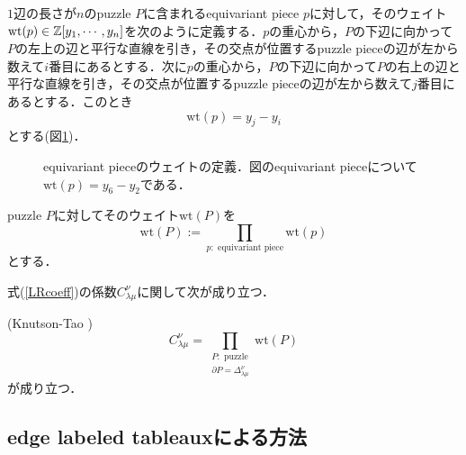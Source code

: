 \begin{defin}
  $1$辺の長さが$n$のpuzzle $P$に含まれるequivariant piece $p$に対して，そのウェイト$\text{wt}(p)\in\mathbb{Z}[y_1,\cdots,y_n]$を次のように定義する．$p$の重心から，$P$の下辺に向かって$P$の左上の辺と平行な直線を引き，その交点が位置するpuzzle pieceの辺が左から数えて$i$番目にあるとする．次に$p$の重心から，$P$の下辺に向かって$P$の右上の辺と平行な直線を引き，その交点が位置するpuzzle pieceの辺が左から数えて$j$番目にあるとする．このとき
  \[
  \text{wt}(p)=y_j-y_i
  \]
  とする(図\ref{puzzle weight})．
\end{defin}

\begin{figure}[htbp]
  \centering
  \caption{equivariant pieceのウェイトの定義．図のequivariant pieceについて$\text{wt}(p)=y_6-y_2$である．}\label{puzzle weight}
\end{figure}


\begin{defin}
  puzzle $P$に対してそのウェイト$\text{wt}(P)$を
  \[
  \text{wt}(P):=\prod_{p:\text{ equivariant piece}}\text{wt}(p)
  \]
  とする．
\end{defin}

式(\ref{LRcoeff})の係数$C^\nu_{\lambda\mu}$に関して次が成り立つ．

\begin{theo}(Knutson-Tao \cite{knutson tao})
  \[
  C^\nu_{\lambda\mu}=\prod_{\substack{P:\text{ puzzle} \\ \partial P = \Delta^\nu_{\lambda\mu}}}\text{wt}(P)
  \]
  が成り立つ．
\end{theo}



\subsection{edge labeled tableauxによる方法}

